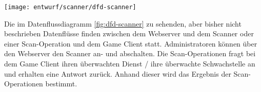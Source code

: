 \begin{center}
	\texttt{[image: entwurf/scanner/dfd-scanner]}
	\label{fig:dfd-scanner}
\end{center}

Die im Datenflussdiagramm \ref{fig:dfd-scanner} zu sehenden, aber bisher nicht beschrieben Datenflüsse finden zwischen dem Webserver und dem Scanner oder einer Scan-Operation und dem Game Client statt. Administratoren können über den Webserver den Scanner an- und abschalten. Die Scan-Operationen fragt bei dem Game Client ihren überwachten Dienst / ihre überwachte Schwachstelle an und erhalten eine Antwort zurück. Anhand dieser wird das Ergebnis der Scan-Operationen bestimmt.